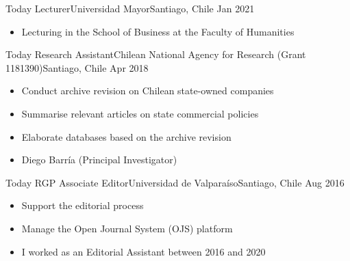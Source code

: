 






\begin{experiences}
  \emptySeparator 
  \experience 
    {Today} {Lecturer}{Universidad Mayor}{Santiago, Chile} {Jan 2021}
    {\begin{itemize}
    \item Lecturing in the School of Business at the Faculty of Humanities
    \end{itemize}}
    {}
\end{experiences}
\vspace{-2mm}

\begin{experiences}
  \emptySeparator 
  \experience 
    {Today} {Research Assistant}{Chilean National Agency for Research (Grant 1181390)}{Santiago, Chile} {Apr 2018}
    {\begin{itemize}
    \item Conduct archive revision on Chilean state-owned companies
    \item Summarise relevant articles on state commercial policies
    \item Elaborate databases based on the archive revision
    \item Diego Barría {\small (Principal Investigator)}
    \end{itemize}}
    {}
\end{experiences}
\vspace{-2mm}

\begin{experiences}
  \experience
    {Today} {RGP Associate Editor}{Universidad de Valparaíso}{Santiago, Chile} {Aug 2016}
    {\begin{itemize}
    \item Support the editorial process
    \item Manage the Open Journal System (OJS) platform 
    \item I worked as an Editorial Assistant between 2016 and 2020
    \end{itemize}}
    {}
\end{experiences}
\vspace{-2mm}

